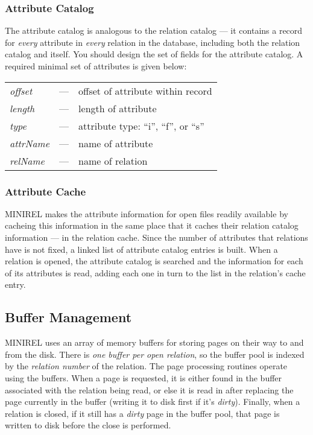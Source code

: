 \subsubsection{Attribute Catalog}
The attribute catalog is analogous to the relation catalog --- it
contains a record for \emph{every} attribute in \emph{every} relation
in the database, including both the relation catalog and itself.  You
should design the set of fields for the attribute catalog.  A required 
minimal set of attributes is given below:
\begin{center}
\begin{tabular}{l l l}
\emph{offset} &---& offset of attribute within record 
\\
\emph{length} &---& length of attribute 
\\
\emph{type} &---& attribute type:  ``i'', ``f'', or ``s'' 
\\
\emph{attrName} &---& name of attribute 
\\
\emph{relName} &---& name of relation
\end{tabular}
\end{center}

\subsubsection{Attribute Cache}
MINIREL makes the attribute information for open files readily
available by cacheing this information in the same place that it
caches their relation catalog information --- in the relation cache.
Since the number of attributes that relations have is not fixed,
a linked list of attribute catalog entries is built.  When a relation
is opened, the attribute catalog is searched and the information
for each of its attributes is read, adding each one in turn to the
list in the relation's cache entry.

\subsection{Buffer Management}
MINIREL uses an array of memory buffers for storing pages on their
way to and from the disk.  There is \emph{one buffer per open
relation}, so the buffer pool is indexed by the \emph{relation
number} of the relation.  The page processing routines operate
using the buffers.  When a page is requested, it is either found
in the buffer associated with the relation being read, or else it
is read in after replacing the page currently in the buffer (writing
it to disk first if it's \emph{dirty}).  Finally, when a relation
is closed, if it still has a \emph{dirty} page in the buffer pool,
that page is written to disk before the close is performed.

